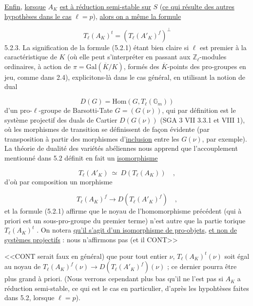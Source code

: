 
\underline{Enfin}, \underline{lorsque} $A_K$ \underline{est à réduction semi-stable sur} $S$ (\underline{ce qui résulte des autres hypothèses dans le cas} $\ell = p$), \underline{alors on a même la formule}

\begin{equation}\tag{5.2.2}
T_\ell(A_K)^t = (T_\ell(A'_K)^f)^\perp
\end{equation}
5.2.3. La signification de la formule (5.2.1) étant bien claire si $\ell$ est premier à la caractéristique de $K$ (où elle peut s'interpréter en passant aux $\mathbb{Z}_\ell$-modules ordinaires, à action de $\pi = \mathrm{Gal}(\overline{K}/K)$, formés des $\overline{K}$-points des pro-groupes en jeu, comme dans 2.4), explicitons-là dans le cas général, en utilisant la notion de dual

\begin{equation}\tag{5.2.3.1}
D(G) = \mathrm{Hom}(G,T_\ell(\mathbb{G}_m))
\end{equation}
d'un pro-$\ell$-groupe de Barsotti-Tate $G = (G(\nu))$, qui par définition est le système projectif des duals de Cartier $D(G(\nu))$ (SGA 3 VII 3.3.1 et VIII 1), où les morphismes de transition se définissent de façon évidente (par transposition à partir des morphismes d'\underline{inclusion} entre les $G(\nu)$, par exemple). La théorie de dualité des variétés abéliennes nous apprend que l'accouplement mentionné dans 5.2 définit en fait un \underline{isomorphisme}

\begin{equation}\tag{5.2.3.2}
T_\ell(A'_K) \ \simeq \ D(T_\ell(A_K)) \quad ,
\end{equation}
d'où par composition un morphisme

\begin{equation}\tag{5.2.3.3}
T_\ell(A_K)^f \longrightarrow D(T_\ell(A'_K)^f) \quad ,
\end{equation}
et la formule (5.2.1) affirme que le noyau de l'homomorphisme précédent (qui à priori est un sous-pro-groupe du premier terme) n'est autre que la partie torique $T_\ell(A_K)^t$ . On notera \underline{qu'il s'agit d'un isomorphisme de pro-objets}, \underline{et non de systèmes projectifs} : nous n'affirmons pas (et il CONT>>



<<CONT serait faux en général) que pour tout entier $\nu$, $T_\ell(A_K)^t(\nu)$ soit égal au noyau de $T_\ell(A_K)^f(\nu) \longrightarrow D(T_\ell(A'_K)^f)(\nu)$ ; ce dernier pourra être plus grand à priori. (Nous verrons cependant plus bas qu'il ne l'est pas si $A_K$ a réduction semi-stable, ce qui est le cas en particulier, d'après les hypohtèses faites dans 5.2, lorsque $\ell = p$).

